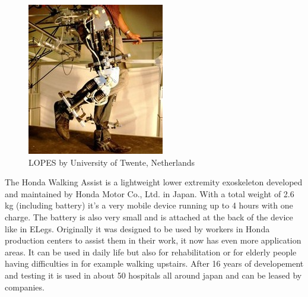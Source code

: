 \documentclass[letterpaper, 10 pt, conference]{ieeeconf}  %
\begin{document}

\begin{figure}[H]
  \centering
    \includegraphics[scale=1.1]{img/lopes}
  \caption{LOPES by University of Twente, Netherlands}
\end{figure}


The Honda Walking Assist is a lightweight lower extremity exoskeleton developed and maintained by Honda Motor Co., Ltd. in Japan. With a total weight of 2.6 kg (including battery) it's a very mobile device running up to 4 hours with one charge. The battery is also very small and is attached at the back of the device like in ELegs. Originally it was designed to be used by workers in Honda production centers to assist them in their work, it now has even more application areas. It can be used in daily life but also for rehabilitation or for elderly people having difficulties in for example walking upstairs. After 16 years of developement and testing it is used in about 50 hospitals all around japan and can be leased by companies.

\end{document}
